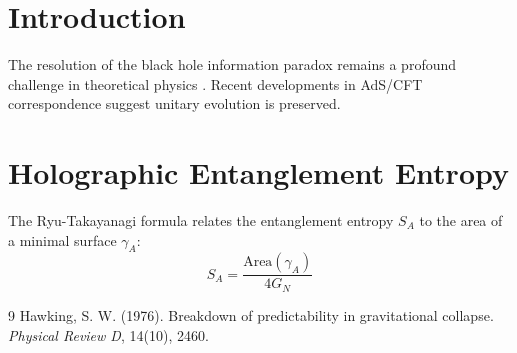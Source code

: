 \documentclass{article}
\begin{document}
\section{Introduction}
The resolution of the black hole information paradox remains a profound challenge in theoretical physics \cite{hawking1976}. Recent developments in AdS/CFT correspondence suggest unitary evolution is preserved.
\section{Holographic Entanglement Entropy}
The Ryu-Takayanagi formula relates the entanglement entropy $S_A$ to the area of a minimal surface $\gamma_A$:
\begin{equation}
S_A = \frac{\text{Area}(\gamma_A)}{4G_N}
\end{equation}
\begin{thebibliography}{9}
Hawking, S. W. (1976). Breakdown of predictability in gravitational collapse. \textit{Physical Review D}, 14(10), 2460.
\end{thebibliography}
\end{document}
